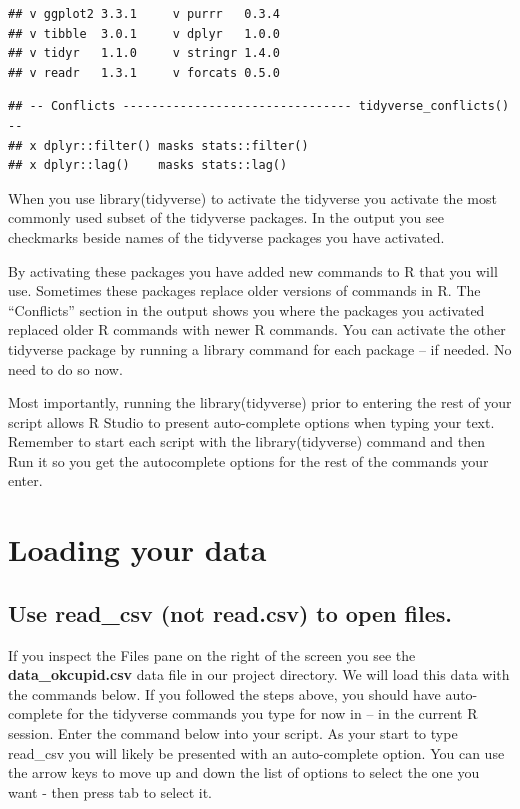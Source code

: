\documentclass[
]{krantz}
\begin{document}
\begin{verbatim}
## v ggplot2 3.3.1     v purrr   0.3.4
## v tibble  3.0.1     v dplyr   1.0.0
## v tidyr   1.1.0     v stringr 1.4.0
## v readr   1.3.1     v forcats 0.5.0
\end{verbatim}

\begin{verbatim}
## -- Conflicts -------------------------------- tidyverse_conflicts() --
## x dplyr::filter() masks stats::filter()
## x dplyr::lag()    masks stats::lag()
\end{verbatim}

When you use library(tidyverse) to activate the tidyverse you activate the most commonly used subset of the tidyverse packages. In the output you see checkmarks beside names of the tidyverse packages you have activated.

By activating these packages you have added new commands to R that you will use. Sometimes these packages replace older versions of commands in R. The ``Conflicts'' section in the output shows you where the packages you activated replaced older R commands with newer R commands. You can activate the other tidyverse package by running a library command for each package -- if needed. No need to do so now.

Most importantly, running the library(tidyverse) prior to entering the rest of your script allows R Studio to present auto-complete options when typing your text. Remember to start each script with the library(tidyverse) command and then Run it so you get the autocomplete options for the rest of the commands your enter.

\hypertarget{loading-your-data}{%
\section{Loading your data}\label{loading-your-data}}

\hypertarget{use-read_csv-not-read.csv-to-open-files.}{%
\subsection{Use read\_csv (not read.csv) to open files.}\label{use-read_csv-not-read.csv-to-open-files.}}

If you inspect the Files pane on the right of the screen you see the \textbf{data\_okcupid.csv} data file in our project directory. We will load this data with the commands below. If you followed the steps above, you should have auto-complete for the tidyverse commands you type for now in -- in the current R session. Enter the command below into your script. As your start to type read\_csv you will likely be presented with an auto-complete option. You can use the arrow keys to move up and down the list of options to select the one you want - then press tab to select it.
\end{document}
